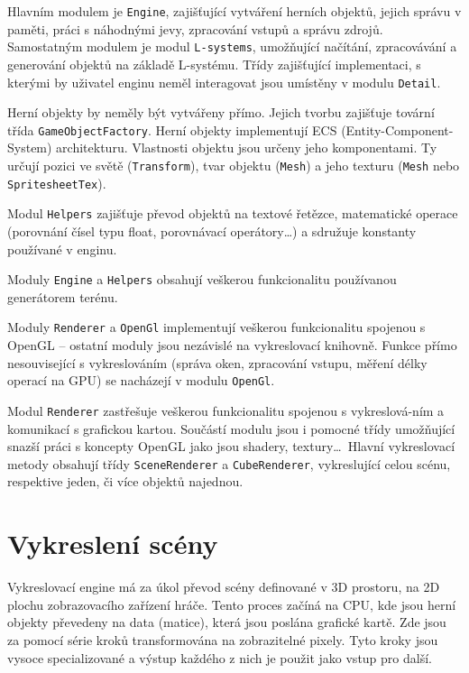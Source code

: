 \documentclass[thesis=M,czech]{FITthesis}[2019/12/23]
\begin{document}
Hlavním modulem je \texttt{Engine}, zajišťující vytváření herních objektů, jejich správu v paměti, práci s náhodnými jevy, zpracování vstupů a správu zdrojů. Samostatným modulem je modul \texttt{L-systems}, umožňující načítání, zpracovávání a generování objektů na základě L-systému. Třídy zajišťující implementaci, s kterými by uživatel enginu neměl interagovat jsou umístěny v modulu \texttt{Detail}.

Herní objekty by neměly být vytvářeny přímo. Jejich tvorbu zajišťuje tovární třída \texttt{GameObjectFactory}. Herní objekty implementují ECS (Entity-Component-System) architekturu. Vlastnosti objektu jsou určeny jeho komponentami. Ty určují pozici ve světě (\texttt{Transform}), tvar objektu (\texttt{Mesh}) a jeho texturu (\texttt{Mesh} nebo \texttt{SpritesheetTex}).

Modul \texttt{Helpers} zajišťuje převod objektů na textové řetězce, matematické operace (porovnání čísel typu float, porovnávací operátory\dots) a sdružuje konstanty používané v enginu.

Moduly \texttt{Engine} a \texttt{Helpers} obsahují veškerou funkcionalitu používanou generátorem terénu. 

Moduly \texttt{Renderer} a \texttt{OpenGl} implementují veškerou funkcionalitu spojenou s OpenGL -- ostatní moduly jsou nezávislé na vykreslovací knihovně. Funkce přímo nesouvisející s vykreslováním (správa oken, zpracování vstupu, měření délky operací na GPU) se nacházejí v modulu \texttt{OpenGl}.

Modul \texttt{Renderer} zastřešuje veškerou funkcionalitu spojenou s vykreslová-ním a komunikací s grafickou kartou. Součástí modulu jsou i pomocné třídy umožňující snazší práci s koncepty OpenGL jako jsou shadery, textury\dots ~Hlavní vykreslovací metody obsahují třídy \texttt{SceneRenderer} a \texttt{CubeRenderer}, vykreslující celou scénu, respektive jeden, či více objektů najednou.


\chapter{Vykreslení scény}

Vykreslovací engine má za úkol převod scény definované v 3D prostoru, na 2D plochu zobrazovacího zařízení hráče. Tento proces začíná na CPU, kde jsou herní objekty převedeny na data (matice), která jsou poslána grafické kartě. Zde jsou za pomocí série kroků transformována na zobrazitelné pixely. Tyto kroky jsou vysoce specializované a výstup každého z nich je použit jako vstup pro další. 
\end{document}
